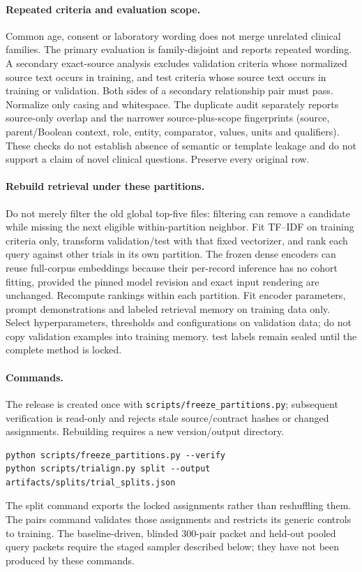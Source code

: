 \documentclass[10pt,letterpaper]{article}
\newcommand{\pathcode}[1]{\nolinkurl{#1}}
\begin{document}
\paragraph{Repeated criteria and evaluation scope.}
Common age, consent or laboratory wording does not merge unrelated clinical
families. The primary evaluation is family-disjoint and reports repeated wording.
A secondary exact-source analysis excludes validation criteria whose normalized
source text occurs in training, and test criteria whose source text occurs in
training or validation. Both sides of a secondary relationship pair must pass.
Normalize only casing and whitespace. The duplicate audit separately reports
source-only overlap and the narrower source-plus-scope fingerprints (source,
parent/Boolean context, role, entity, comparator, values, units and qualifiers).
These checks do not establish absence of semantic or template leakage and do
not support a claim of novel clinical questions. Preserve every original row.

\paragraph{Rebuild retrieval under these partitions.}
Do not merely filter the old global top-five files: filtering can remove a
candidate while missing the next eligible within-partition neighbor. Fit TF--IDF
on training criteria only, transform validation/test with that fixed vectorizer,
and rank each query against other trials in its own partition. The frozen dense
encoders can reuse full-corpus embeddings because their per-record inference
has no cohort fitting, provided the pinned model revision and exact input
rendering are unchanged. Recompute rankings within each partition. Fit encoder parameters, prompt demonstrations and labeled retrieval memory
on training data only. Select hyperparameters, thresholds and configurations
on validation data; do not copy validation examples into training memory.
test labels remain sealed until the complete method is locked.

\paragraph{Commands.}
The release is created once with \pathcode{scripts/freeze_partitions.py};
subsequent verification is read-only and rejects stale source/contract hashes
or changed assignments. Rebuilding requires a new version/output directory.
\begin{Verbatim}[breaklines=true,fontsize=\small]
python scripts/freeze_partitions.py --verify
python scripts/trialign.py split --output artifacts/splits/trial_splits.json
\end{Verbatim}
The split command exports the locked assignments rather than reshuffling them.
The pairs command validates those assignments and restricts its generic controls
to training. The baseline-driven, blinded 300-pair packet and held-out pooled
query packets require the staged sampler described below; they have not been
produced by these commands.
\end{document}
